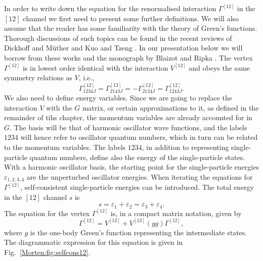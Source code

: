 In order to write down the equation for the renormalised 
interaction $\Gamma^{[12]}$ in the 
$[12]$ channel we first need to present some further definitions.
We will also assume that the reader has some familiarity with the theory 
of Green's functions. Thorough discussions of such topics
can be found in the recent reviews of Dickhoff and M\"uther \cite{Morten:dm92}
and Kuo and Tzeng \cite{Morten:kt94}. In our presentation below we will
borrow from these works and the monograph by Blaizot and Ripka \cite{Morten:br86}.
The vertex $\Gamma^{[12]}$ is in lowest order identical with the 
interaction $V^{[12]}$ and obeys the same symmetry relations
as $V$, i.e.,
\begin{equation}
     \Gamma^{[12]}_{1234J}=\Gamma^{[12]}_{2143J}=-\Gamma^{[12]}_{2134J}=
     \Gamma^{[12]}_{1243J}.
     \label{Morten:eq:symproperties}
\end{equation}
We also need to define energy variables. Since we are going to replace
the interaction $V$ with the $G$ matrix, or certain 
approximations to it, as defined in the remainder of tihs chapter, the
momentum variables are already accounted for in $G$. The basis will be
that of harmonic oscillator wave functions, and the labels $1234$ will
hence refer to oscillator quantum numbers, which in turn can be
related to the momentum variables. The labels $1234$, in addition to
representing single-particle quantum numbers, define also the energy
of the single-particle states. With a harmonic oscillator basis, the
starting point for the single-particle energies
$\varepsilon_{1,2,3,4}$ are the unperturbed oscillator energies. When
iterating the equations for $\Gamma^{[12]}$, self-consistent
single-particle energies can be introduced.
The total energy in the $[12]$ channel $s$ is
\begin{equation}
    s=\varepsilon_1+\varepsilon_2=\varepsilon_3+\varepsilon_4.
    \label{Morten:eq:energy12}
\end{equation}
The equation for the vertex $\Gamma^{[12]}$ is,
in a compact matrix notation, given by \cite{Morten:br86}
\begin{equation}
     \Gamma^{[12]}=V^{[12]}+V^{[12]}(gg)\Gamma^{[12]},
     \label{Morten:eq:schematic12}
\end{equation}
where $g$ is the one-body Green's function representing 
the intermediate states. 
The diagrammatic expression for this equation is
given in Fig.~\ref{Morten:fig:selfcons12}. 
